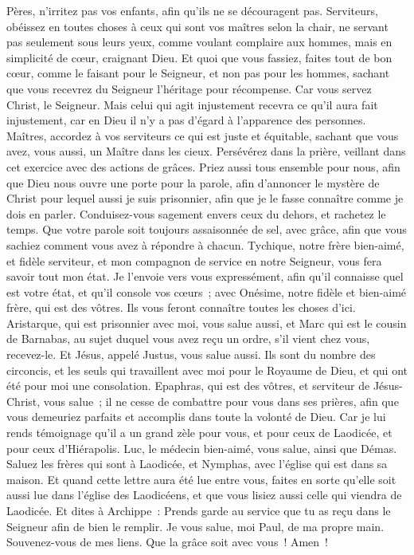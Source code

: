 \begin{multicols}{2}
Pères, n'irritez pas vos enfants, afin qu'ils ne se découragent pas.
Serviteurs, obéissez en toutes choses à ceux qui sont vos maîtres selon la chair, ne servant pas seulement sous leurs yeux, comme voulant complaire aux hommes, mais en simplicité de cœur, craignant Dieu.
Et quoi que vous fassiez, faites tout de bon cœur, comme le faisant pour le Seigneur, et non pas pour les hommes,
sachant que vous recevrez du Seigneur l'héritage pour récompense. Car vous servez Christ, le Seigneur.
Mais celui qui agit injustement recevra ce qu'il aura fait injustement, car en Dieu il n'y a pas d'égard à l'apparence des personnes.
\VerseOne{}Maîtres, accordez à vos serviteurs ce qui est juste et équitable, sachant que vous avez, vous aussi, un Maître dans les cieux.
Persévérez dans la prière, veillant dans cet exercice avec des actions de grâces.
Priez aussi tous ensemble pour nous, afin que Dieu nous ouvre une porte pour la parole, afin d'annoncer le mystère de Christ pour lequel aussi je suis prisonnier, 
afin que je le fasse connaître comme je dois en parler.
Conduisez-vous sagement envers ceux du dehors, et rachetez le temps.
Que votre parole soit toujours assaisonnée de sel, avec grâce, afin que vous sachiez comment vous avez à répondre à chacun.
Tychique, notre frère bien-aimé, et fidèle serviteur, et mon compagnon de service en notre Seigneur, vous fera savoir tout mon état.
Je l'envoie vers vous expressément, afin qu'il connaisse quel est votre état, et qu'il console vos cœurs~;
avec Onésime, notre fidèle et bien-aimé frère, qui est des vôtres. Ils vous feront connaître toutes les choses d'ici.
Aristarque, qui est prisonnier avec moi, vous salue aussi, et Marc qui est le cousin de Barnabas, au sujet duquel vous avez reçu un ordre, s'il vient chez vous, recevez-le.
Et Jésus, appelé Justus, vous salue aussi. Ils sont du nombre des circoncis, et les seuls qui travaillent avec moi pour le Royaume de Dieu, et qui ont été pour moi une consolation.
Epaphras, qui est des vôtres, et serviteur de Jésus-Christ, vous salue~; il ne cesse de combattre pour vous dans ses prières, afin que vous demeuriez parfaits et accomplis dans toute la volonté de Dieu.
Car je lui rends témoignage qu'il a un grand zèle pour vous, et pour ceux de Laodicée, et pour ceux d'Hiérapolis.
Luc, le médecin bien-aimé, vous salue, ainsi que Démas.
Saluez les frères qui sont à Laodicée, et Nymphas, avec l'église qui est dans sa maison.
Et quand cette lettre aura été lue entre vous, faites en sorte qu'elle soit aussi lue dans l'église des Laodicéens, et que vous lisiez aussi celle qui viendra de Laodicée.
Et dites à Archippe~: Prends garde au service que tu as reçu dans le Seigneur afin de bien le remplir.
Je vous salue, moi Paul, de ma propre main. Souvenez-vous de mes liens. Que la grâce soit avec vous~! Amen~!
\PPE{}
\end{multicols}
